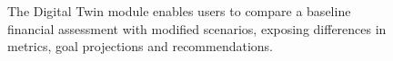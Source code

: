 
\begin{figure}[H]
\centering
{}
\caption{The Digital Twin module enables users to compare a baseline financial assessment with modified scenarios, exposing differences in metrics, goal projections and recommendations.}
\label{fig:twin}
\end{figure}